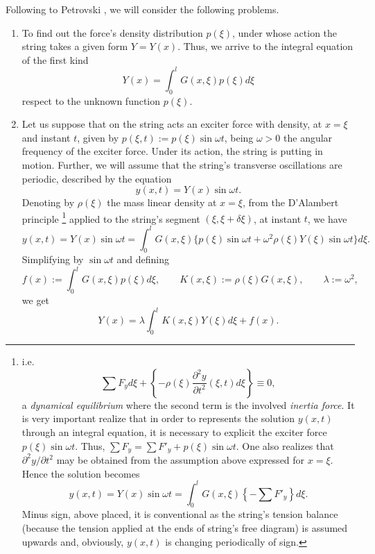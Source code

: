 \documentclass[12pt]{article}
\begin{document}
Following to Petrovski \cite{cite:Petrovski}, we will consider the following problems.
\begin{enumerate}
\item To find out the force's density distribution $p(\xi)$, under whose action the string takes a given form $Y=Y(x)$. Thus, we arrive to the integral equation of the first kind
\begin{equation}
Y(x)=\int_0^l G(x,\xi)p(\xi)d\xi
\end{equation}
respect to the unknown function $p(\xi)$.
\item Let us suppose that on the string acts an exciter force with density, at $x=\xi$ and instant $t$, given by $p(\xi,t):=p(\xi)\sin\omega t$, being $\omega>0$ the angular frequency of the exciter force. Under its action, the string is putting in motion. Further, we will assume that the string's transverse oscillations are periodic, described by the equation
\begin{equation*} 
y(x,t)=Y(x)\sin\omega t.
\end{equation*}
Denoting by $\rho(\xi)$ the mass linear density at $x=\xi$, from the {\small{D}}'Alambert principle {\footnote{i.e.
\begin{equation*}
\sum F_yd\xi+\left\{-\rho(\xi)\frac{\partial^2 y}{\partial t^2}(\xi,t)d\xi\right\}\equiv 0,
\end{equation*}
a \emph{dynamical equilibrium} where the second term is the involved \emph{inertia force}. It is very important realize that in order to represents the solution $y(x,t)$ through an integral equation, it is necessary to explicit the exciter force $p(\xi)\sin\omega t$. Thus, $\sum F_y=\sum F'_y+p(\xi)\sin\omega t$. One also realizes that $\partial^2 y/\partial t^2$ may be obtained from the assumption above expressed for $x=\xi$. Hence the solution becomes
\begin{equation*}
y(x,t)=Y(x)\sin\omega t=\int_0^l G(x,\xi)\left\{-\sum F'_y \right\}d\xi.
\end{equation*}
Minus sign, above placed, it is conventional as the string's tension balance (because the tension applied at the ends of string's free diagram) is assumed upwards and, obviously, $y(x,t)$ is changing periodically of sign. }} 
applied to the string's segment $(\xi,\xi+\delta\xi)$, at instant $t$, we have
\begin{equation*}
y(x,t)=Y(x)\sin\omega t=\int_0^l G(x,\xi) \{p(\xi)\sin\omega t+\omega^2\rho(\xi)Y(\xi)\sin\omega t\}d\xi.
\end{equation*}
Simplifying by $\sin\omega t$ and defining
\begin{equation*}
f(x):=\int_0^l G(x,\xi)p(\xi)d\xi, \qquad K(x,\xi):=\rho(\xi)G(x,\xi), \qquad \lambda:=\omega^2,
\end{equation*}
we get
\begin{equation}
Y(x)=\lambda\int_0^l K(x,\xi)Y(\xi)d\xi+f(x).
\end{equation}
\end{enumerate}
\end{document}
